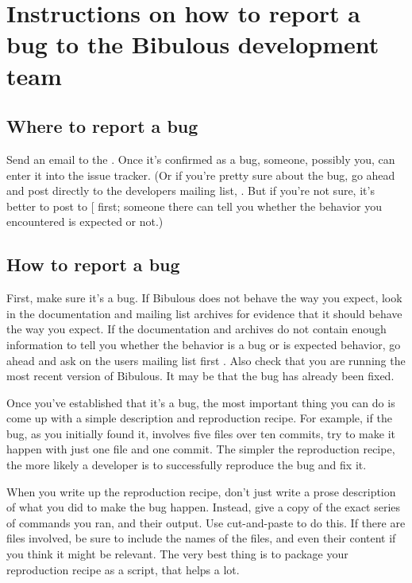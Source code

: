 \documentclass[letterpaper,10pt,english]{sphinxmanual}
\begin{document}
\chapter{Instructions on how to report a bug to the Bibulous development team}
\label{instructions_for_reporting_bugs:instructions-on-how-to-report-a-bug-to-the-bibulous-development-team}\label{instructions_for_reporting_bugs::doc}

\section{Where to report a bug}
\label{instructions_for_reporting_bugs:where-to-report-a-bug}
Send an email to the . Once it's confirmed as a bug, someone, possibly you, can enter it into the issue tracker. (Or if you're pretty sure about the bug, go ahead and post directly to the developers mailing list, . But if you're not sure, it's better to post to {[}\code{users mailing list}{]} first; someone there can tell you whether the behavior you encountered is expected or not.)


\section{How to report a bug}
\label{instructions_for_reporting_bugs:how-to-report-a-bug}
First, make sure it's a bug. If Bibulous does not behave the way you expect, look in the documentation and mailing list archives for evidence that it should behave the way you expect. If the documentation and archives do not contain enough information to tell you whether the behavior is a bug or is expected behavior, go ahead and ask on the users mailing list first . Also check that you are running the most recent version of Bibulous. It may be that the bug has already been fixed.

Once you've established that it's a bug, the most important thing you can do is come up with a simple description and reproduction recipe. For example, if the bug, as you initially found it, involves five files over ten commits, try to make it happen with just one file and one commit. The simpler the reproduction recipe, the more likely a developer is to successfully reproduce the bug and fix it.

When you write up the reproduction recipe, don't just write a prose description of what you did to make the bug happen. Instead, give a copy of the exact series of commands you ran, and their output. Use cut-and-paste to do this. If there are files involved, be sure to include the names of the files, and even their content if you think it might be relevant. The very best thing is to package your reproduction recipe as a script, that helps a lot.
\end{document}
